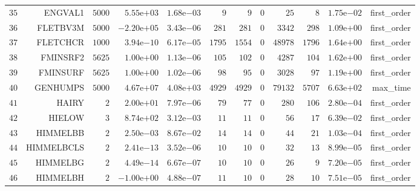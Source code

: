 \begin{longtable}{rrrrrrrrrrrr}
  \(    35\) & ENGVAL1 & \(  5000\) & \( 5.55\)e\(+03\) & \( 1.68\)e\(-03\) & \(     9\) & \(     9\) & \(     0\) & \(    25\) & \(     8\) & \( 1.75\)e\(-02\) & first\_order \\
  \(    36\) & FLETBV3M & \(  5000\) & \(-2.20\)e\(+05\) & \( 3.43\)e\(-06\) & \(   281\) & \(   281\) & \(     0\) & \(  3342\) & \(   298\) & \( 1.09\)e\(+00\) & first\_order \\
  \(    37\) & FLETCHCR & \(  1000\) & \( 3.94\)e\(-10\) & \( 6.17\)e\(-05\) & \(  1795\) & \(  1554\) & \(     0\) & \( 48978\) & \(  1796\) & \( 1.64\)e\(+00\) & first\_order \\
  \(    38\) & FMINSRF2 & \(  5625\) & \( 1.00\)e\(+00\) & \( 1.13\)e\(-06\) & \(   105\) & \(   102\) & \(     0\) & \(  4287\) & \(   104\) & \( 1.62\)e\(+00\) & first\_order \\
  \(    39\) & FMINSURF & \(  5625\) & \( 1.00\)e\(+00\) & \( 1.02\)e\(-06\) & \(    98\) & \(    95\) & \(     0\) & \(  3028\) & \(    97\) & \( 1.19\)e\(+00\) & first\_order \\
  \(    40\) & GENHUMPS & \(  5000\) & \( 4.67\)e\(+07\) & \( 4.08\)e\(+03\) & \(  4929\) & \(  4929\) & \(     0\) & \( 79132\) & \(  5707\) & \( 6.63\)e\(+02\) & max\_time \\
  \(    41\) & HAIRY & \(     2\) & \( 2.00\)e\(+01\) & \( 7.97\)e\(-06\) & \(    79\) & \(    77\) & \(     0\) & \(   280\) & \(   106\) & \( 2.80\)e\(-04\) & first\_order \\
  \(    42\) & HIELOW & \(     3\) & \( 8.74\)e\(+02\) & \( 3.12\)e\(-03\) & \(    11\) & \(    11\) & \(     0\) & \(    56\) & \(    17\) & \( 6.39\)e\(-02\) & first\_order \\
  \(    43\) & HIMMELBB & \(     2\) & \( 2.50\)e\(-03\) & \( 8.67\)e\(-02\) & \(    14\) & \(    14\) & \(     0\) & \(    44\) & \(    21\) & \( 1.03\)e\(-04\) & first\_order \\
  \(    44\) & HIMMELBCLS & \(     2\) & \( 2.41\)e\(-13\) & \( 3.52\)e\(-06\) & \(    10\) & \(    10\) & \(     0\) & \(    32\) & \(    13\) & \( 8.99\)e\(-05\) & first\_order \\
  \(    45\) & HIMMELBG & \(     2\) & \( 4.49\)e\(-14\) & \( 6.67\)e\(-07\) & \(    10\) & \(    10\) & \(     0\) & \(    26\) & \(     9\) & \( 7.20\)e\(-05\) & first\_order \\
  \(    46\) & HIMMELBH & \(     2\) & \(-1.00\)e\(+00\) & \( 4.88\)e\(-07\) & \(    11\) & \(    10\) & \(     0\) & \(    28\) & \(    10\) & \( 7.51\)e\(-05\) & first\_order \\

\end{longtable}
